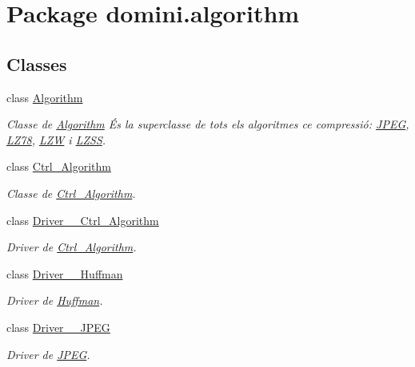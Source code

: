 \hypertarget{namespacedomini_1_1algorithm}{}\section{Package domini.\+algorithm}
\label{namespacedomini_1_1algorithm}
\subsection*{Classes}
\begin{DoxyCompactItemize}
\item 
class \hyperlink{classdomini_1_1algorithm_1_1Algorithm}{Algorithm}
\begin{DoxyCompactList}\small\item\em Classe de \hyperlink{classdomini_1_1algorithm_1_1Algorithm}{Algorithm} És la superclasse de tots els algoritmes ce compressió\+: \hyperlink{classdomini_1_1algorithm_1_1JPEG}{J\+P\+EG}, \hyperlink{classdomini_1_1algorithm_1_1LZ78}{L\+Z78}, \hyperlink{classdomini_1_1algorithm_1_1LZW}{L\+ZW} i \hyperlink{classdomini_1_1algorithm_1_1LZSS}{L\+Z\+SS}. \end{DoxyCompactList}\item 
class \hyperlink{classdomini_1_1algorithm_1_1Ctrl__Algorithm}{Ctrl\+\_\+\+Algorithm}
\begin{DoxyCompactList}\small\item\em Classe de \hyperlink{classdomini_1_1algorithm_1_1Ctrl__Algorithm}{Ctrl\+\_\+\+Algorithm}. \end{DoxyCompactList}\item 
class \hyperlink{classdomini_1_1algorithm_1_1Driver____Ctrl__Algorithm}{Driver\+\_\+\+\_\+\+Ctrl\+\_\+\+Algorithm}
\begin{DoxyCompactList}\small\item\em Driver de \hyperlink{classdomini_1_1algorithm_1_1Ctrl__Algorithm}{Ctrl\+\_\+\+Algorithm}. \end{DoxyCompactList}\item 
class \hyperlink{classdomini_1_1algorithm_1_1Driver____Huffman}{Driver\+\_\+\+\_\+\+Huffman}
\begin{DoxyCompactList}\small\item\em Driver de \hyperlink{classHuffman}{Huffman}. \end{DoxyCompactList}\item 
class \hyperlink{classdomini_1_1algorithm_1_1Driver____JPEG}{Driver\+\_\+\+\_\+\+J\+P\+EG}
\begin{DoxyCompactList}\small\item\em Driver de \hyperlink{classdomini_1_1algorithm_1_1JPEG}{J\+P\+EG}. \end{DoxyCompactList}\item 

\end{DoxyCompactItemize}
